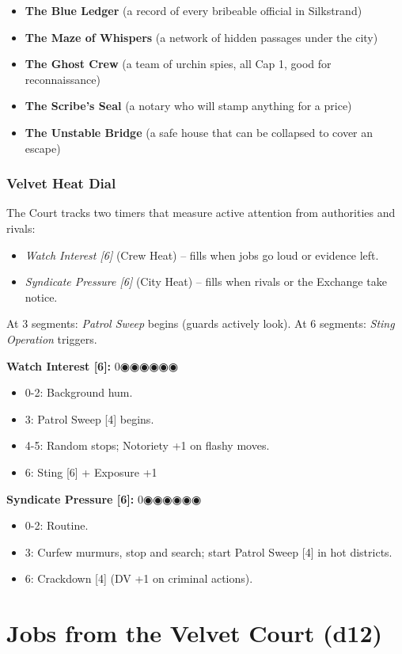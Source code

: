 \documentclass[10pt,twoside]{book}
\begin{document}
\begin{itemize}
\item \textbf{The Blue Ledger} (a record of every bribeable official in Silkstrand)
\item \textbf{The Maze of Whispers} (a network of hidden passages under the city)
\item \textbf{The Ghost Crew} (a team of urchin spies, all Cap 1, good for reconnaissance)
\item \textbf{The Scribe's Seal} (a notary who will stamp anything for a price)
\item \textbf{The Unstable Bridge} (a safe house that can be collapsed to cover an escape)
\end{itemize}

\subsection{Velvet Heat Dial}
The Court tracks two timers that measure active attention from authorities and rivals:
\begin{itemize}
\item \textit{Watch Interest [6]} (Crew Heat) -- fills when jobs go loud or evidence left.
\item \textit{Syndicate Pressure [6]} (City Heat) -- fills when rivals or the Exchange take notice.
\end{itemize}
At 3 segments: \textit{Patrol Sweep} begins (guards actively look).
At 6 segments: \textit{Sting Operation} triggers.

\noindent\textbf{Watch Interest [6]:} 0◉◉◉◉◉◉
\begin{itemize}
\item 0-2: Background hum.
\item 3: Patrol Sweep [4] begins.
\item 4-5: Random stops; Notoriety +1 on flashy moves.
\item 6: Sting [6] + Exposure +1
\end{itemize}

\noindent\textbf{Syndicate Pressure [6]:} 0◉◉◉◉◉◉
\begin{itemize}
\item 0-2: Routine.
\item 3: Curfew murmurs, stop and search; start Patrol Sweep [4] in hot districts.
\item 6: Crackdown [4] (DV +1 on criminal actions).
\end{itemize}

\chapter{Jobs from the Velvet Court (d12)}
\end{document}
